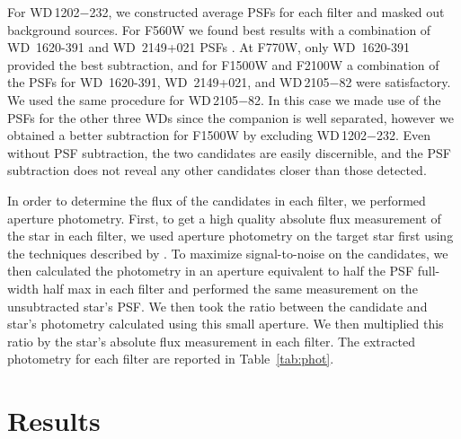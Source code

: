 \documentclass[twocolumn]{aastex631}
\newcommand{\wdA}{WD\,1202$-$232}
\newcommand{\wdB}{WD\,2105$-$82}
\begin{document}
For \wdA, we constructed average PSFs for each filter and masked out background sources.  For F560W we found best results with a combination of WD~1620-391 and WD~2149+021 PSFs \citep{Mullally2021jwst.prop.1911M, Poulsen2023}. At F770W, only WD~1620-391 provided the best subtraction, and for F1500W and F2100W a combination of the PSFs for WD~1620-391, WD~2149+021, and \wdB
were satisfactory.  We used the same procedure for \wdB. In this case we made use of the PSFs for the other three WDs since the companion is well separated, however we obtained a better subtraction for F1500W by excluding \wdA. Even without PSF subtraction, the two candidates are easily discernible, and the PSF subtraction does not reveal any other candidates closer than those detected. 

In order to determine the flux of the candidates in each filter, we performed aperture photometry. First, to get a high quality absolute flux measurement of the star in each filter, we used aperture photometry on the target star first using the techniques described by \citet{Poulsen2023}. To maximize signal-to-noise on the candidates, we then calculated the photometry in an aperture equivalent to half the PSF full-width half max in each filter and performed the same measurement on the unsubtracted star's PSF. We then took the ratio between the candidate and star's photometry calculated using this small aperture. We then multiplied this ratio by the star's absolute flux measurement in each filter. The extracted photometry for each filter are reported in Table~\ref{tab:phot}.



\section{Results}
\end{document}
